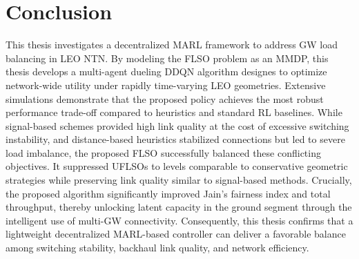 \chapter{Conclusion}

\quad This thesis investigates a decentralized MARL framework to address GW load balancing in LEO NTN. By modeling the FLSO problem as an MMDP, this thesis develops a multi-agent dueling DDQN algorithm designes to optimize network-wide utility under rapidly time-varying LEO geometries. Extensive simulations demonstrate that the proposed policy achieves the most robust performance trade-off compared to heuristics and standard RL baselines. While signal-based schemes provided high link quality at the cost of excessive switching instability, and distance-based heuristics stabilized connections but led to severe load imbalance, the proposed FLSO successfully balanced these conflicting objectives. It suppressed UFLSOs to levels comparable to conservative geometric strategies while preserving link quality similar to signal-based methods. Crucially, the proposed algorithm significantly improved Jain’s fairness index and total throughput, thereby unlocking latent capacity in the ground segment through the intelligent use of multi-GW connectivity. Consequently, this thesis confirms that a lightweight decentralized MARL-based controller can deliver a favorable balance among switching stability, backhaul link quality, and network efficiency.